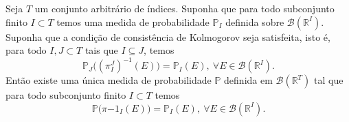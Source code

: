 \begin{teorema}
\label{teo-exist-kolmogorov-nao-enumeravel}
Seja $T$ um conjunto arbitrário de índices. 
Suponha que para todo subconjunto finito $I\subset T$
temos uma medida de probabilidade $\mathbb{P}_{I}$
definida sobre $\mathscr{B}(\mathbb{R}^I)$.
Suponha que a condição de consistência de Kolmogorov 
seja satisfeita, isto é, para todo $I,J\subset T$ 
tais que $I\subseteq J$, temos
\[
\mathbb{P}_{J}\big( (\pi^{J}_{I})^{-1}(E) \big)
=
\mathbb{P}_{I}(E),
\ \forall E\in\mathscr{B}(\mathbb{R}^{I}).
\]
Então existe uma única medida de probabilidade 
$\mathbb{P}$ definida em $\mathscr{B}(\mathbb{R}^T)$ 
tal que para todo subconjunto finito $I\subset T$ temos
\[
\mathbb{P}\big(\pi{-1}_{I}(E) ) = \mathbb{P}_{I}(E),
\ \forall E\in\mathscr{B}(\mathbb{R}^{I}).
\]
\end{teorema}